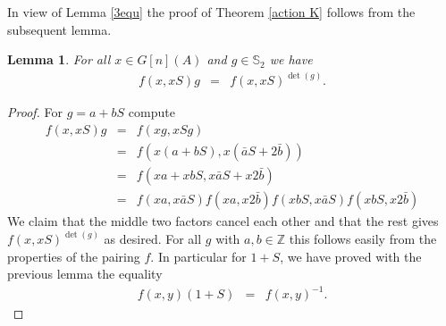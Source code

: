\documentclass{amsart}
\renewcommand{\S}{{\mathbb S}}
\newcommand {\Z}{{\mathbb Z}}
\numberwithin{equation}{section}
\newtheorem{lemma}[thm]{Lemma}
\theoremstyle{definition}  %
\newtheorem{set theory}[thm]{Set Theoretic Prelude}
\begin{document}
In view of Lemma \ref{3equ}
 the proof of Theorem \ref{action K} follows from the subsequent lemma.
\begin{lemma}
For all $x\in G[n](A)$ and $g\in \S_2$ we have
\begin{eqnarray}\label{actionf}
f(x,xS)g&=&f(x,xS)^{\det(g)}.
\end{eqnarray}
\end{lemma}

\begin{proof}
For $g=a+bS$ compute
\begin{eqnarray*}
f(x,xS)g&=&f(xg,xSg)\\ 
&=&f(x({a+bS}),x({\bar{a}S+2\bar{b}}))\\
&=& f(x{a}+x{bS},x{\bar{a}S}+x{2\bar{b}})\\
&=&  f(x{a},x{\bar{a}S}) f(x{a},x{2\bar{b}})  f(x{bS},x{\bar{a}S})  f(x{bS},x{2\bar{b}})
\end{eqnarray*}
We claim that the middle two factors cancel each other and that the rest gives
$
f(x,xS)^{\det(g)}
$
as desired.
For all $g$ with $a,b\in \Z$ this follows easily from the properties of  the pairing $f$. 
In particular for $1+S$, we have proved with the previous lemma the equality
\begin{eqnarray*}\label{actionfxy}
f(x,y)(1+S)&=&f(x,y)^{-1}.
\end{eqnarray*}


\end{proof}
\end{document}
